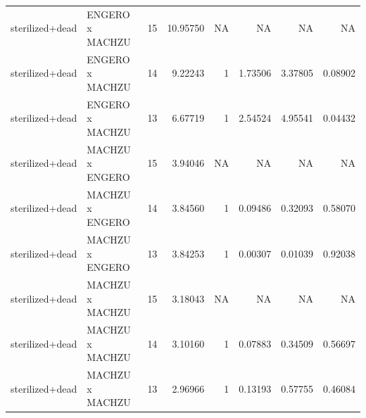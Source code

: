 \begin{table}[t]
\begin{tabular*}{\linewidth}{@{\extracolsep{\fill}}clrrrrrr}
sterilized+dead & ENGERO x MACHZU & 15 & 10.95750 & NA & NA & NA & NA \\ 
sterilized+dead & ENGERO x MACHZU & 14 & 9.22243 & 1 & 1.73506 & 3.37805 & 0.08902 \\ 
sterilized+dead & ENGERO x MACHZU & 13 & 6.67719 & 1 & 2.54524 & 4.95541 & 0.04432 \\ 
sterilized+dead & MACHZU x ENGERO & 15 & 3.94046 & NA & NA & NA & NA \\ 
sterilized+dead & MACHZU x ENGERO & 14 & 3.84560 & 1 & 0.09486 & 0.32093 & 0.58070 \\ 
sterilized+dead & MACHZU x ENGERO & 13 & 3.84253 & 1 & 0.00307 & 0.01039 & 0.92038 \\ 
sterilized+dead & MACHZU x MACHZU & 15 & 3.18043 & NA & NA & NA & NA \\ 
sterilized+dead & MACHZU x MACHZU & 14 & 3.10160 & 1 & 0.07883 & 0.34509 & 0.56697 \\ 
sterilized+dead & MACHZU x MACHZU & 13 & 2.96966 & 1 & 0.13193 & 0.57755 & 0.46084 \\ 
\bottomrule
\end{tabular*}
\end{table}

